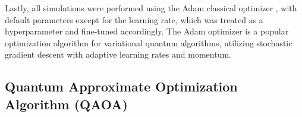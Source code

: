 Lastly, all simulations were performed using the Adam classical optimizer \cite{kingma2017adam}, with default parameters except for the learning rate, which was treated as a hyperparameter and fine-tuned accordingly. The Adam optimizer is a popular optimization algorithm for variational quantum algorithms, utilizing stochastic gradient descent with adaptive learning rates and momentum.



\subsection{Quantum Approximate Optimization Algorithm (QAOA)}
\label{subsection:QAOA_Implementation}


